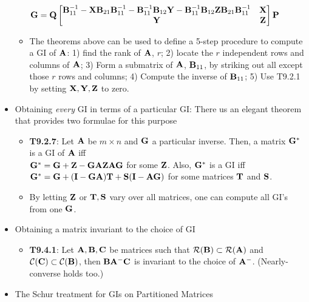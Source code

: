 \documentclass[a4paper, oneside]{book}
\begin{document}
\begin{itemize}
\begin{itemize}
	$\mathbf{G}=\mathbf Q \begin{bmatrix}
	\mathbf B^{-1}_{11}-\mathbf{X}\mathbf B_{21} \mathbf B^{-1}_{11}-\mathbf B^{-1}_{11} \mathbf B_{12} \mathbf Y - \mathbf B^{-1}_{11} \mathbf B_{12} \mathbf{ZB}_{21}\mathbf B^{-1}_{11} & \mathbf X \\
	\mathbf Y & \mathbf Z
	\end{bmatrix}\mathbf P$
	\item The theorems above can be used to define a 5-step procedure to compute a GI of $\mathbf A$: 1) find the rank of $\mathbf A$, $r$; 2) locate the $r$ independent rows and columns of $\mathbf A$; 3) Form a submatrix of $\mathbf A$, $\mathbf B_{11}$, by striking out all except those $r$ rows and columns; 4) Compute the inverse of $\mathbf B_{11}$; 5) Use T9.2.1 by setting $\mathbf{X,Y,Z}$ to zero.
	\end{itemize}
	\item Obtaining \textit{every} GI in terms of a particular GI: There us an elegant theorem that provides two formulae for this purpose
	\begin{itemize}
		\item \textbf{T9.2.7}: Let $\mathbf A$ be $m\times n$ and $\mathbf G$ a particular inverse. Then, a matrix $\mathbf G^*$ is a GI of $\mathbf A$ iff \\
	$\mathbf G^* = \mathbf{G+Z-GAZAG}$ for some $\mathbf Z$. Also, $\mathbf G^*$ is a GI iff \\
	$\mathbf{G^*=G+(I-GA)T+S(I-AG)}$ for some matrices $\mathbf T$ and $\mathbf S$.
		\item By letting $\mathbf Z$ or $\mathbf{T, S}$ vary over all matrices, one can compute all GI's from one $\mathbf G$.
	\end{itemize}
	\item Obtaining a matrix invariant to the choice of GI
	\begin{itemize}
	\item \textbf{T9.4.1}: 	Let $\mathbf{A,B,C}$ be matrices such that $\mathcal{R}(\mathbf B) \subset \mathcal{R}(\mathbf A)$ and $\mathcal{C}(\mathbf C) \subset \mathcal{C}(\mathbf B)$, then $\mathbf{BA^-C}$ is invariant to the choice of $\mathbf A^-$. (Nearly-converse holds too.)
	\end{itemize}
	\item The Schur treatment for GIs on Partitioned Matrices
\end{itemize}
\end{document}
